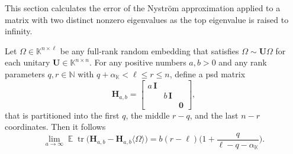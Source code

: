 \documentclass[11pt]{article}
\newcommand{\field}{\mathbb{K}}
\DeclareMathOperator{\tr}{tr}
\newcommand{\mat}[1]{\boldsymbol{#1}}
\newcommand{\Id}{\mathbf{I}}
\DeclareMathOperator{\expect}{\mathbb{E}}
\theoremstyle{definition}
\numberwithin{equation}{section}
\begin{document}
This section calculates the error of the Nystr\"om approximation applied to a matrix with two distinct nonzero eigenvalues as the top eigenvalue is raised to infinity.

\begin{lemma} \label{lem:two-eigenvalues}
    Let $\mat{\varOmega} \in \field^{n \times \ell}$ be any full-rank random embedding that satisfies $\mat{\varOmega} \sim \mat{U} \mat{\varOmega}$ for each unitary $\mat{U} \in \field^{n \times n}$.
    For any positive numbers $a,b > 0$ and any rank parameters $q, r \in \mathbb{N}$ with $q + \alpha_{\field} < \ell \leq r \leq n$, define a psd matrix
    \begin{equation*}
        \mat{H}_{a,b} = \begin{bmatrix}
            a\,\Id & & \\
            & b\,\Id & \\
            & & \mat{0}
        \end{bmatrix},
    \end{equation*}
    that is partitioned into the first $q$, the middle $r - q$, and the last $n - r$ coordinates.
    Then it follows
    \begin{equation*}
        \lim_{a \rightarrow \infty} \expect \tr\bigl(\mat{H}_{a,b} - \mat{H}_{a,b}\langle \mat{\varOmega} \rangle\bigr) 
        = b(r-\ell) \biggl(1 + \frac{q}{\ell - q - \alpha_\field}\biggr).
    \end{equation*}
\end{lemma}
\end{document}
